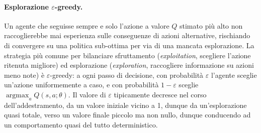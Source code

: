 \paragraph{Esplorazione $\varepsilon$-greedy.} Un agente che seguisse sempre
e solo l'azione a valore $Q$ stimato più alto non raccoglierebbe mai
esperienza sulle conseguenze di azioni alternative, rischiando di convergere
su una politica sub-ottima per via di una mancata esplorazione. 
La strategia più comune per bilanciare sfruttamento (\emph{exploitation},
scegliere l'azione ritenuta migliore) ed esplorazione
(\emph{exploration}, raccogliere informazione su azioni meno note) è
$\varepsilon$-greedy: a ogni passo di decisione, con probabilità
$\varepsilon$ l'agente sceglie un'azione uniformemente a caso, e con
probabilità $1-\varepsilon$ sceglie $\operatorname*{argmax}_a Q(s,a;\theta)$.
Il valore di $\varepsilon$ tipicamente decresce nel corso dell'addestramento, da
un valore iniziale vicino a 1, dunque da un'esplorazione quasi totale, 
verso un valore finale piccolo ma non nullo, dunque conducendo ad un comportamento quasi del tutto deterministico.

